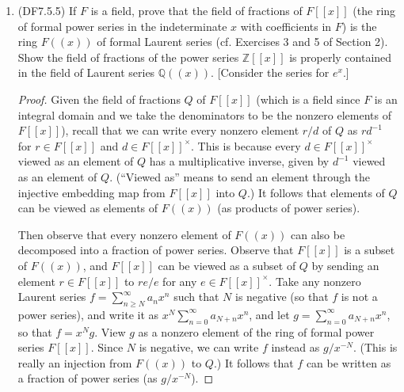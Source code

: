 \documentclass[11pt]{article}
\newcommand{\cbr}[1]{\left\{#1\right\}}
\begin{document}
\begin{enumerate}
\begin{enumerate}
\begin{proof}
            We show that $R = \cbr{f\in F((x))\mid \nu(f)\geq 0}\cup \cbr{0}$ is equal to $F[[x]]$. It is clear that $0$ is in both sets, and that nonzero elements of $F[[x]]$ are contained in $R$ since a nonzero element of $F[[x]]$ only has terms with nonnegative powers of $x$, so that its first nonzero term has index greater than or equal to zero. Similarly, a nonzero element of $R$ has the condition that its valuation is nonnegative, meaning that its first nonzero term has index greater than or equal to zero. This is exactly the same condition needed for a series to be an element of $F[[x]]$, so the reverse containment is also clear. Hence the discrete valuation ring of $\nu$ is $F[[x]]$.
        \end{proof}
    \end{enumerate}
    \item (DF7.5.5) If $F$ is a field, prove that the field of fractions of $F[[x]]$ (the ring of formal power series in the indeterminate $x$ with coefficients in $F$) is the ring $F((x))$ of formal Laurent series (cf. Exercises 3 and 5 of Section 2). Show the field of fractions of the power series $\mathbb{Z}[[x]]$ is properly contained in the field of Laurent series $\mathbb{Q}((x))$. [Consider the series for $e^x$.] \begin{proof}
        Given the field of fractions $Q$ of $F[[x]]$ (which is a field since $F$ is an integral domain and we take the denominators to be the nonzero elements of $F[[x]]$), recall that we can write every nonzero element $r/d$ of $Q$ as $rd^{-1}$ for $r\in F[[x]]$ and $d\in F[[x]]^\times$. This is because every $d\in F[[x]]^\times$ viewed as an element of $Q$ has a multiplicative inverse, given by $d^{-1}$ viewed as an element of $Q$. (``Viewed as'' means to send an element through the injective embedding map from $F[[x]]$ into $Q$.) It follows that elements of $Q$ can be viewed as elements of $F((x))$ (as products of power series).

        Then observe that every nonzero element of $F((x))$ can also be decomposed into a fraction of power series. Observe that $F[[x]]$ is a subset of $F((x))$, and $F[[x]]$ can be viewed as a subset of $Q$ by sending an element $r\in F[[x]]$ to $re/e$ for any $e\in F[[x]]^\times$. Take any nonzero Laurent series $f = \sum_{n\geq N}^\infty a_nx^n$ such that $N$ is negative (so that $f$ is not a power series), and write it as $x^N\sum_{n=0}^{\infty}a_{N+n}x^n$, and let $g = \sum_{n=0}^{\infty}a_{N+n}x^n$, so that $f = x^Ng$. View $g$ as a nonzero element of the ring of formal power series $F[[x]]$. Since $N$ is negative, we can write $f$ instead as $g /x^{-N}$. (This is really an injection from $F((x))$ to $Q$.) It follows that $f$ can be written as a fraction of power series (as $g/x^{-N}$). 


\end{proof}
\end{enumerate}
\end{document}
